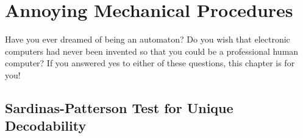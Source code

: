 \documentclass[a4paper,12pt]{report}
\begin{document}
\chapter{Annoying Mechanical Procedures} 

Have you ever dreamed of being an automaton? Do you wish that electronic
computers had never been invented so that you could be a professional human
computer? If you answered yes to either of these questions, this chapter is for
you!

\section{Sardinas-Patterson Test for Unique Decodability}
\end{document}
